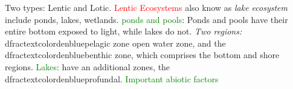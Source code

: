 \documentclass{article}
\author{SBHS Science Olympiad}
\newcommand{\red}[1]{\textcolor{red}{#1}}
\newcommand{\green}[1]{\textcolor{green}{#1}}
\newcommand{\blue}[1]{\\dfrac{textcolor}{den}{blue}{#1}}
\begin{document}
	\begin{multicols}{4}
			Two types: Lentic and Lotic. \red{Lentic Ecosystems} also know as \textit{lake ecosystem} include ponds, lakes, wetlands. 
			\green{ponds and pools}:
			Ponds and pools have their entire bottom exposed to light, while lakes do not. 
			\textit{Two regions:} \blue{pelagic zone} open water zone, and the \blue{benthic zone}, which comprises the bottom and shore regions. 
			\green{Lakes}: have an additional zones, the \blue{profundal}. \green{Important abiotic factors}
	\end{multicols}
\end{document}

